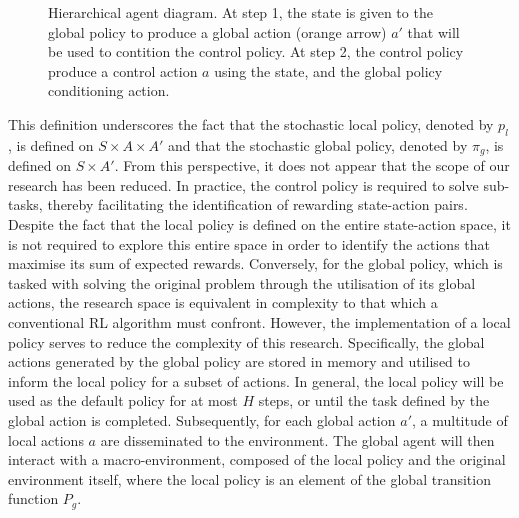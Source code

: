 \begin{figure}
    \caption{Hierarchical agent diagram. At step 1, the state is given to the global policy to produce a global action
        (orange arrow) $a'$ that will be used to contition the control policy. At step 2, the control policy produce a
        control action $a$ using the state, and the global policy conditioning action.}
    \label{figure:bg:plan-rl:wrapped-agent}
\end{figure}

This definition underscores the fact that the stochastic local policy, denoted by $p_l$, is defined on
$S \times A \times A'$ and that the stochastic global policy, denoted by $\pi_g$, is defined on $S \times A'$.
From this perspective, it does not appear that the scope of our research has been reduced.
In practice, the control policy is required to solve sub-tasks, thereby facilitating the identification of rewarding
state-action pairs.
Despite the fact that the local policy is defined on the entire state-action space, it is not required to explore this
entire space in order to identify the actions that maximise its sum of expected rewards.
Conversely, for the global policy, which is tasked with solving the original problem through the utilisation of its
global actions, the research space is equivalent in complexity to that which a conventional RL algorithm must confront.
However, the implementation of a local policy serves to reduce the complexity of this research.
Specifically, the global actions generated by the global policy are stored in memory and utilised to inform the local
policy for a subset of actions.
In general, the local policy will be used as the default policy for at most $H$ steps,
or until the task defined by the global action is completed.
Subsequently, for each global action $a'$, a multitude of local actions $a$ are disseminated to the environment.
The global agent will then interact with a macro-environment, composed of the local policy and the original environment
itself, where the local policy is an element of the global transition function $P_g$.

